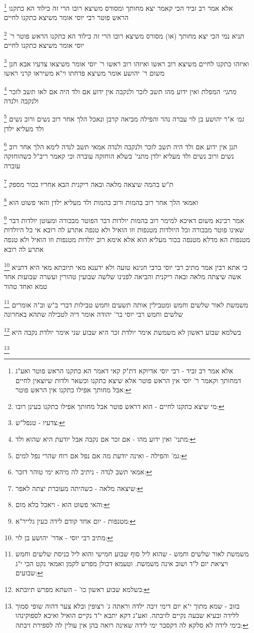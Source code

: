 \documentclass[12pt, openany]{book}
\newcommand{\footnotecomment}[1]{
	\renewcommand\thefootnote{}
	\footnote{#1}}
\newcommand{\commenta}[1]{\footnotecomment{#1}}
\begin{document}
{\commenta{אלא אמר רב זביד - רבי יוסי אדיוקא דת"ק קאי דאמר הא כתקנו הראש פוטר ואע"ג דמחותך וקאמר ר' יוסי אין הראש פוטר אלא שיצא כתקנו וכשאר ולדות שיוצאין לחיים אבל מחותך אפילו כתקנו אין הראש פוטר:}
אלא אמר רב זביד הכי קאמר יצא מחותך ומסורס משיצא רובו הרי זה כילוד הא כתקנו הראש פוטר רבי יוסי אומר משיצא כתקנו לחיים 
\commenta{מי שיצא כתקנו לחיים - הוא דראש פוטר אבל מחותך אפילו כתקנו בעינן רובו:}
תניא נמי הכי יצא מחותך (או) מסורס משיצא רובו הרי זה כילוד הא כתקנו הראש פוטר ר' יוסי אומר משיצא כתקנו לחיים 
\commenta{צדעיו - טנפל"ש:}
ואיזהו כתקנו לחיים משיצא רוב ראשו ואיזהו רוב ראשו ר' יוסי אומר משיצאו צדעיו אבא חנן משום ר' יהושע אומר משיצא פדחתו וי"א משיראו קרני ראשו
\commenta{מתני' ואין ידוע מהו - אם זכר אם נקבה אבל יודעת היא שהוא ולד:}
{\large\emph{מתני׳}} המפלת ואין ידוע מהו תשב לזכר ולנקבה אין ידוע אם ולד היה אם לאו תשב לזכר ולנקבה ולנדה
\commenta{גמ' והפילה - ואינה יודעת מה אם נפל אם רוח שהרי נפל למים:}
{\large\emph{גמ׳}} א"ר יהושע בן לוי עברה נהר והפילה מביאה קרבן ונאכל הלך אחר רוב נשים ורוב נשים ולד מעליא ילדן 
\commenta{אמאי תשב לנדה - ניתיב לה מיהא ימי טוהר דזכר:}
תנן אין ידוע אם ולד היה תשב לזכר ולנקבה ולנדה אמאי תשב לנדה לימא הלך אחר רוב נשים ורוב נשים ולד מעליא ילדן 
מתני' בשלא הוחזקה עוברה וכי קאמר ריב"ל כשהוחזקה עוברה 
\commenta{שיצאה מלאה - כשהיתה מעוברת יצתה לאפר:}
ת"ש בהמה שיצאה מלאה ובאה ריקנית הבא אחריו בכור מספק 
\commenta{והאי פשוט הוא - ויאכל בלא מום:}
ואמאי הלך אחר רוב בהמות ורוב בהמות ולד מעליא ילדן והאי פשוט הוא 
\commenta{מטנפות - יום אחד קודם לידה כעין גלייר"א:}
אמר רבינא משום דאיכא למימר רוב בהמות יולדות דבר הפוטר מבכורה ומעוטן יולדות דבר שאינו פוטר מבכורה וכל היולדות מטנפות וזו הואיל ולא טנפה אתרע לה רובא 
אי כל היולדות מטנפות הא מדלא מטנפה בכור מעליא הוא אלא אימא רוב יולדות מטנפות וזו הואיל ולא טנפה אתרע לה רובא 
\commenta{מתיב רבי יוסי - אדר' יהושע בן לוי:}
כי אתא רבין אמר מתיב רבי יוסי ברבי חנינא טועה ולא ידענא מאי תיובתא מאי היא דתניא
אשה שיצתה מלאה ובאה ריקנית והביאה לפנינו שלשה שבועין טהורין ועשרה שבועות אחד טמא ואחד טהור
\commenta{משמשת לאור שלשים וחמש - שהוא ליל סוף שבוע חמישי והוא ליל כניסת שלשים וחמש ויציאת יום ל"ד ושוב אינה משמשת. וטעמא דכולן מפרש לקמן ואמאי נקט הכי י"ג שבועים:}
משמשת לאור שלשים וחמש ומטבילין אותה תשעים וחמש טבילות דברי ב"ש וב"ה אומרים שלשים וחמש רבי יוסי בר' יהודה אומר דיה לטבילה שתהא באחרונה 
\commenta{בשלמא שבוע ראשון כו' - השתא מפרש תיובתא:}
בשלמא שבוע ראשון לא משמשת אימר יולדת זכר היא שבוע שני אימר יולדת נקבה היא
\commenta{בזוב - שמא מתוך י"א יום דימי זיבה ילדה וראתה ג' רצופין ובלא צער דהוה שופי סמוך ללידה ובעיא שבעה נקיים לזיבתה. ואע"ג דקא יתבא י"ד נקיים הואיל ואיכא לספוקינהו בימי לידה לא סלקא לה דקסבר ימי לידה שאינה רואה בהן אין עולין לה לספירת זיבתה:}
}
\end{document}
